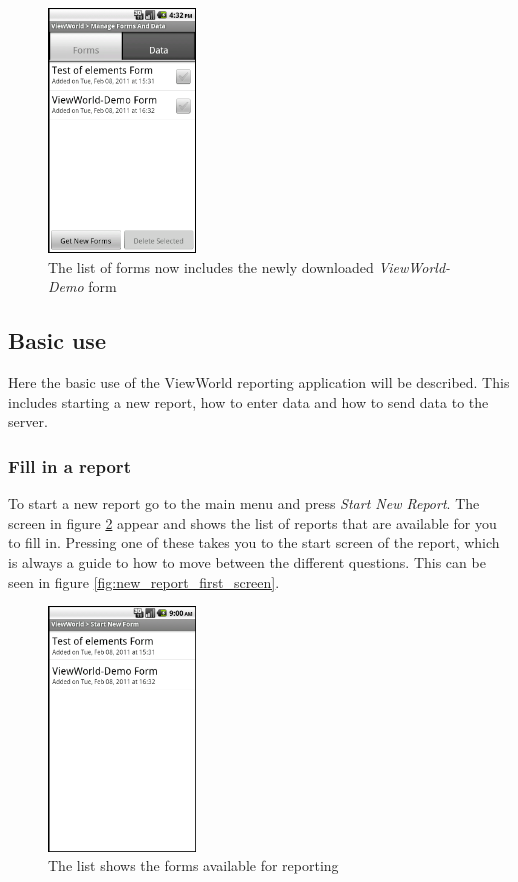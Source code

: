 \documentclass[a4paper, 12pt, final]{article}
\begin{document}
\begin{figure}[h!]
  \centering
      \includegraphics[width=0.35\textwidth]{pics/new_form_downloaded.png}
  \caption{The list of forms now includes the newly downloaded \emph{ViewWorld-Demo} form}
  \label{fig:new_form_downloaded}
\end{figure}

\newpage
\subsection{Basic use}

Here the basic use of the ViewWorld reporting application will be described. This includes starting a new report, how to enter data and how to send data to the server.

\subsubsection{Fill in a report}

To start a new report go to the main menu and press \emph{Start New Report}. The screen in figure \ref{fig:start_new_form_list} appear and shows the list of reports that are available for you to fill in. Pressing one of these takes you to the start screen of the report, which is always a guide to how to move between the different questions. This can be seen in figure \ref{fig:new_report_first_screen}.

\begin{figure}[!htbp]
  \centering
      \includegraphics[width=0.35\textwidth]{pics/start_new_form_list.png}
  \caption{The list shows the forms available for reporting}
  \label{fig:start_new_form_list}
\end{figure}
\end{document}
